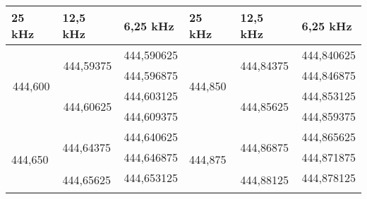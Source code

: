 \begin{table}[H]
	\centering
	\begin{tabular}{|l|l|l|l|l|l|}
		\hline
		\textbf{25 kHz}                                & \textbf{12,5 kHz}                               & \textbf{6,25 kHz}               & \textbf{25 kHz}                               & \textbf{12,5 kHz}                               & \textbf{6,25 kHz}               \\ \hline
		\multicolumn{1}{|c|}{\multirow{4}{*}{444,600}} & \multicolumn{1}{c|}{\multirow{2}{*}{444,59375}} & \multicolumn{1}{c|}{444,590625} & \multicolumn{1}{l|}{\multirow{4}{*}{444,850}} & \multicolumn{1}{l|}{\multirow{2}{*}{444,84375}} & \multicolumn{1}{l|}{444,840625} \\ \cline{3-3}\cline{6-6}
		\multicolumn{1}{|c|}{}                         & \multicolumn{1}{c|}{}                           & \multicolumn{1}{c|}{444,596875} & \multicolumn{1}{l|}{}                         & \multicolumn{1}{l|}{}                           & \multicolumn{1}{l|}{444,846875} \\ \cline{2-3}\cline{5-6}
		\multicolumn{1}{|c|}{}                         & \multicolumn{1}{c|}{\multirow{2}{*}{444,60625}} & \multicolumn{1}{c|}{444,603125} & \multicolumn{1}{l|}{}                         & \multicolumn{1}{l|}{\multirow{2}{*}{444,85625}} & \multicolumn{1}{l|}{444,853125} \\ \cline{3-3}\cline{6-6}
		\multicolumn{1}{|c|}{}                         & \multicolumn{1}{c|}{}                           & \multicolumn{1}{c|}{444,609375} & \multicolumn{1}{l|}{}                         & \multicolumn{1}{l|}{}                           & \multicolumn{1}{l|}{444,859375} \\ \hline
		\multirow{4}{*}{444,650}                       & \multirow{2}{*}{444,64375}                      & 444,640625                      & \multicolumn{1}{l|}{\multirow{4}{*}{444,875}} & \multicolumn{1}{l|}{\multirow{2}{*}{444,86875}} & \multicolumn{1}{l|}{444,865625} \\ \cline{3-3}\cline{6-6}
		                                               &                                                 & 444,646875                      & \multicolumn{1}{l|}{}                         & \multicolumn{1}{l|}{}                           & \multicolumn{1}{l|}{444,871875} \\ \cline{2-3}\cline{5-6}
		                                               & \multirow{2}{*}{444,65625}                      & 444,653125                      & \multicolumn{1}{l|}{}                         & \multicolumn{1}{l|}{\multirow{2}{*}{444,88125}} & \multicolumn{1}{l|}{444,878125} \\ \cline{3-3}\cline{6-6}

\end{tabular}
\end{table}
